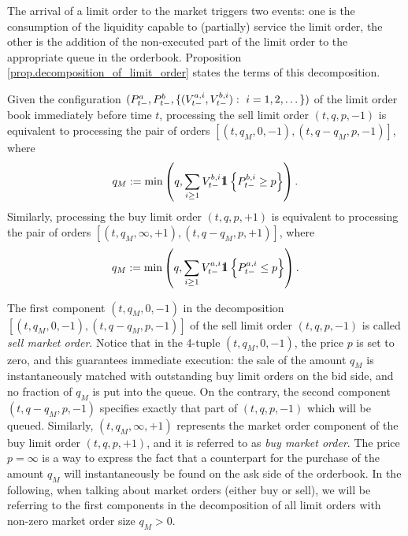 \documentclass[10pt, article,table]{article}
\begin{document}
The arrival of a limit order to the market triggers two events: one is the consumption of the liquidity capable to (partially) service the limit order, the other is the addition of the non-executed part of the limit order to the appropriate queue in the orderbook. Proposition \ref{prop.decomposition_of_limit_order} states the terms of this decomposition.

\begin{prop}\label{prop.decomposition_of_limit_order}
 Given the configuration $(\bestAskPrice_{t-}, \bestBidPrice_{t-},\lbrace  (\nthBestAskVolume[i]_{t-}, \nthBestBidVolume[i]_{t-}) : \, \, i=1,2,\dots\rbrace )$ of the limit order book immediately before time $t$, processing the sell limit order $(t,q,p,-1)$ is equivalent to processing the pair of orders $[(t,q_M,0,-1),(t,q-q_M,p,-1) ]$, where 
 \begin{equation*}
  q_M:= \min\left(q, \sum_{i\geq 1} \nthBestBidVolume[i]_{t-} \one \left\lbrace \nthBestBidPrice[i]_{t-}\geq p\right\rbrace\right).
 \end{equation*}
Similarly, processing the buy limit order $(t,q,p,+1)$ is equivalent to processing the pair of orders $[(t,q_M,\infty,+1),(t,q-q_M,p,+1) ]$, where 
 \begin{equation*}
  q_M:= \min\left (q, \sum_{i\geq 1} \nthBestAskVolume[i]_{t-} \one \left\lbrace \nthBestAskPrice[i]_{t-}\leq  p\right\rbrace\right).
 \end{equation*}
\end{prop}

The first component $(t,q_M,0,-1)$ in the decomposition $[(t,q_M,0,-1),(t,q-q_M,p,-1) ]$ of the sell limit order $(t,q,p,-1)$ is called \emph{sell market order}. Notice that in the 4-tuple $(t,q_M,0,-1)$, the price $p$ is set to zero, and this guarantees immediate execution: the sale of the amount $q_M$ is instantaneously matched with outstanding buy limit orders on the bid side, and no fraction of $q_M$ is put into the queue. On the contrary, the second component $(t,q-q_M,p,-1)$ specifies exactly that part of $(t,q,p,-1)$ which will be queued. 
Similarly, $(t,q_M,\infty,+1)$ represents the market order component of the buy limit order $(t,q,p,+1)$, and it is referred to as \emph{buy market order}. The price $p=\infty$ is a way to express the fact that a counterpart for the purchase of the amount $q_M$ will instantaneously be found on the ask side of the orderbook. In the following, when talking about market orders (either buy or sell), we will be referring to the first components  in the decomposition of all limit orders with non-zero market order size $q_M >0$.
\end{document}
